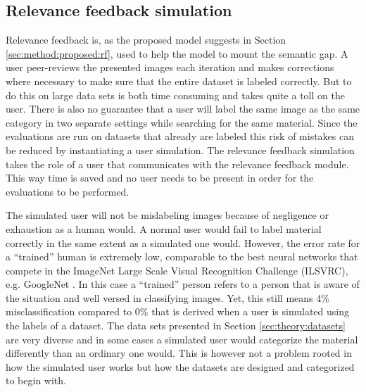 \subsection{Relevance feedback simulation}
\label{sec:method:rf_simulation}
Relevance feedback is, as the proposed model suggests in Section \ref{sec:method:proposed:rf}, used to help the model to mount the semantic gap. A user peer-reviews the presented images each iteration and makes corrections where necessary to make sure that the entire dataset is labeled correctly. But to do this on large data sets is both time consuming and takes quite a toll on the user. There is also no guarantee that a user will label the same image as the same category in two separate settings while searching for the same material. 
Since the evaluations are run on datasets that already are labeled this risk of mistakes can be reduced by instantiating a user simulation. The relevance feedback simulation takes the role of a user that communicates with the relevance feedback module. This way time is saved and no user needs to be present in order for the evaluations to be performed.  

The simulated user will not be mislabeling images because of negligence or exhaustion as a human would. 
A normal user would fail to label material correctly in the same extent as a simulated one would. 
However, the error rate for a ``trained'' human is extremely low, comparable to the best neural networks that compete in the ImageNet Large Scale Visual Recognition Challenge (ILSVRC), e.g. GoogleNet \cite{ImageNetChallenge}. 
In this case a ``trained'' person refers to a person that is aware of the situation and well versed in classifying images. Yet, this still means 4\% misclassification compared to 0\% that is derived when a user is simulated using the labels of a dataset.
The data sets presented in Section \ref{sec:theory:datasets} are very diverse and in some cases a simulated user would categorize the material differently than an ordinary one would. This is however not a problem rooted in how the simulated user works but how the datasets are designed and categorized to begin with.

